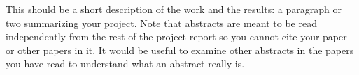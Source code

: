\begin{abstractpage}
This should be a short description of the work and the results: a paragraph 
or two summarizing your project. Note that abstracts are meant to be read 
independently from the rest of the project report so you cannot cite your 
paper or other papers in it. It would be useful to examine other abstracts 
in the papers you have read to understand what an abstract really is.
\end{abstractpage}
